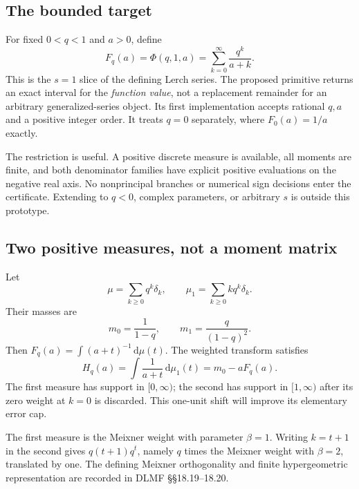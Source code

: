 \documentclass[11pt,a4paper]{article}
\theoremstyle{remark}\newtheorem{remark}[theorem]{Remark}
\newcommand{\PhiL}{\Phi}
\newcommand{\dd}{\,\mathrm d}
\begin{document}
\subsection{The bounded target}

For fixed $0<q<1$ and $a>0$, define
\begin{equation}
 F_q(a)=\PhiL(q,1,a)=\sum_{k=0}^{\infty}\frac{q^k}{a+k}.
 \label{eq:lerch}
\end{equation}
This is the $s=1$ slice of the defining Lerch series.\cite{dlmflerch}
The proposed primitive returns an exact interval for the \emph{function value},
not a replacement remainder for an arbitrary generalized-series object.
Its first implementation accepts rational $q,a$ and a positive integer order.
It treats $q=0$ separately, where $F_0(a)=1/a$ exactly.

The restriction is useful. A positive discrete measure is available, all moments
are finite, and both denominator families have explicit positive evaluations
on the negative real axis. No nonprincipal branches or numerical sign decisions
enter the certificate. Extending to $q<0$, complex parameters, or arbitrary $s$
is outside this prototype.

\subsection{Two positive measures, not a moment matrix}

Let
\[
 \mu=\sum_{k\geq0}q^k\delta_k,
 \qquad \mu_1=\sum_{k\geq0}kq^k\delta_k.
\]
Their masses are
\begin{equation}
 m_0=\frac1{1-q},\qquad m_1=\frac{q}{(1-q)^2}.
 \label{eq:masses}
\end{equation}
Then $F_q(a)=\int(a+t)^{-1}\dd\mu(t)$. The weighted transform satisfies
\begin{equation}
 H_q(a)=\int\frac1{a+t}\dd\mu_1(t)
       =m_0-aF_q(a).
 \label{eq:weighted}
\end{equation}
The first measure has support in $[0,\infty)$; the second has support in
$[1,\infty)$ after its zero weight at $k=0$ is discarded. This one-unit shift
will improve its elementary error cap.

The first measure is the Meixner weight with parameter $\beta=1$. Writing
$k=t+1$ in the second gives $q(t+1)q^t$, namely $q$ times the Meixner weight
with $\beta=2$, translated by one. The defining Meixner orthogonality and
finite hypergeometric representation are recorded in DLMF
\S\S18.19--18.20.\cite{dlmfmeixner,dlmfexplicit}
\end{document}
